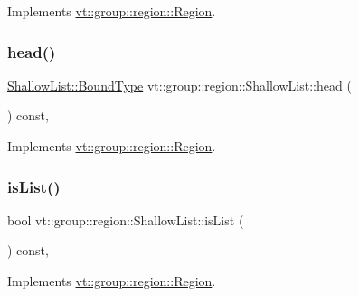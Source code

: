 Implements \hyperlink{structvt_1_1group_1_1region_1_1_region_ab0db5f78c57943b4b9973ba2c7c619f7}{vt\+::group\+::region\+::\+Region}.

\mbox{\label{structvt_1_1group_1_1region_1_1_shallow_list_a249b65b9cc1a44131cf52488baea9a41}} 
\subsubsection{\texorpdfstring{head()}{head()}}
{\footnotesize\ttfamily \hyperlink{structvt_1_1group_1_1region_1_1_region_abf426ff85bed72c1c6524fad6a9f1751}{Shallow\+List\+::\+Bound\+Type} vt\+::group\+::region\+::\+Shallow\+List\+::head (\begin{DoxyParamCaption}{ }\end{DoxyParamCaption}) const\hspace{0.3cm}{\ttfamily [override]}, {\ttfamily [virtual]}}



Implements \hyperlink{structvt_1_1group_1_1region_1_1_region_a09d21333389937f11dd5d3e6ba566c54}{vt\+::group\+::region\+::\+Region}.

\mbox{\label{structvt_1_1group_1_1region_1_1_shallow_list_a5d83012cacf2a8ebeb3edb55603fceaa}} 
\subsubsection{\texorpdfstring{is\+List()}{isList()}}
{\footnotesize\ttfamily bool vt\+::group\+::region\+::\+Shallow\+List\+::is\+List (\begin{DoxyParamCaption}{ }\end{DoxyParamCaption}) const\hspace{0.3cm}{\ttfamily [override]}, {\ttfamily [virtual]}}



Implements \hyperlink{structvt_1_1group_1_1region_1_1_region_a5c05e6ebee5a6d7e77d9ebf33c9ff50c}{vt\+::group\+::region\+::\+Region}.

